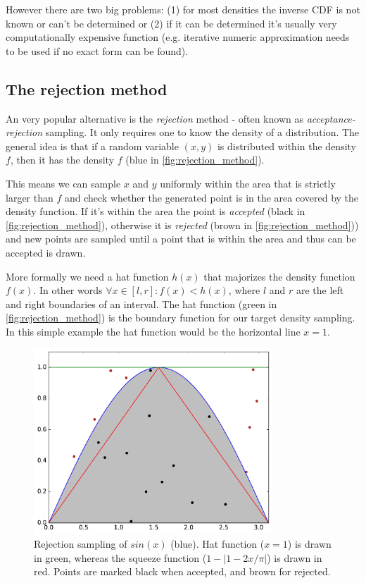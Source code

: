 However there are two big problems: (1) for most densities the inverse CDF is not known or can't be determined or (2) if it can be determined it's usually very computationally expensive function (e.g. iterative numeric approximation needs to be used if no exact form can be found).

\subsection{The rejection method}

An very popular alternative is the \textit{rejection} method - often known as \textit{acceptance-rejection} sampling. It only requires one to know the density of a distribution. The general idea is that if a random variable $(x, y)$ is distributed within the density $f$, then it has the density $f$ (blue in \autoref{fig:rejection_method}).

This means we can sample $x$ and $y$ uniformly within the area that is strictly larger than $f$ and check whether the generated point is in the area covered by the density function. If it's within the area the point is \textit{accepted} (black in \autoref{fig:rejection_method}), otherwise it is \textit{rejected} (brown in \autoref{fig:rejection_method})) and new points are sampled until a point that is within the area and thus can be accepted is drawn.

More formally we need a hat function $h(x)$ that majorizes the density function $f(x)$. In other words $ \forall x \in [l, r]: f(x) < h(x)$, where $l$ and $r$ are the left and right boundaries of an interval.
The hat function (green in \autoref{fig:rejection_method}) is the boundary function for our target density sampling. In this simple example the hat function would be the horizontal line $x = 1$.

\begin{figure}[h!]
\centering
\includegraphics[width=0.8\textwidth]{figs/rejection_sampling.pdf}
\caption{Rejection sampling of $sin(x)$ (blue). Hat function ($x = 1$) is drawn in green, whereas the squeeze function ($1 - |1 - 2x / \pi |$) is drawn in red. Points are marked black when accepted, and brown for rejected.}
\label{fig:rejection_method}
\end{figure}


